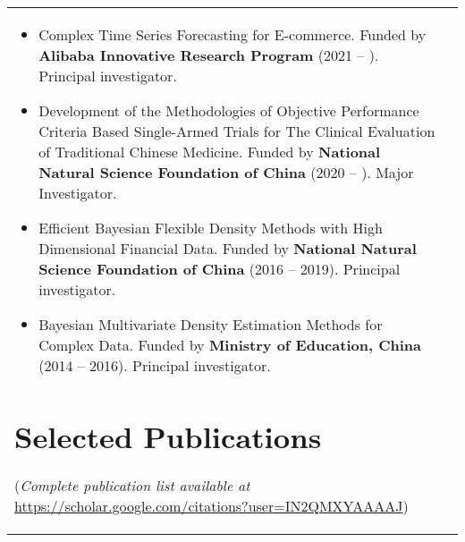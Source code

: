 \documentclass[twoside,a4paper,10.5pt]{article}
\begin{document}
\begin{tabular}{ll}
\begin{itemize}
\item Complex Time Series Forecasting for E-commerce. Funded by \textbf{Alibaba Innovative Research Program} (2021 -- ). Principal investigator.

\item Development of the Methodologies of Objective Performance Criteria Based Single-Armed Trials for The Clinical Evaluation of Traditional Chinese Medicine. Funded by \textbf{National Natural Science Foundation of China} (2020 --  ). Major Investigator.

\item Efficient Bayesian Flexible Density Methods with High Dimensional Financial Data. Funded by \textbf{National Natural Science Foundation of China} (2016 -- 2019). Principal investigator.

\item Bayesian Multivariate Density Estimation Methods for Complex Data. Funded by \textbf{Ministry of Education, China} (2014 -- 2016). Principal investigator.

\end{itemize}

\section*{Selected Publications}

(\emph{Complete publication list available at}
  \url{https://scholar.google.com/citations?user=IN2QMXYAAAAJ})

\begin{refsection}
\nocite{zhang2023optimal_ejor}
\nocite{li2023feature_ijpr}
\nocite{wang2023forecast_ijf}
\nocite{pan2022note_jbes}
\nocite{li2022bayesian_ijf}
\nocite{wang2022escalator_safety}
\nocite{wang2022distributed_ijf}
\nocite{anderer2022forecasting_ijf}
\nocite{janeway2021clinical_jad}
\nocite{petropoulos2021forecasting_ijf}
\nocite{kang2022forecast_ejor}
\nocite{pan2021note_jbes}
\nocite{talagala2022fformpp_ijf}
\nocite{zhu2021least_jcgs}
\nocite{wang2022uncertainty_jors}
\nocite{kang2021deja_jbr}
\nocite{hao2020bilinear_ced}
\nocite{li2020forecasting_eswa}
\nocite{kang2020gratis_sam}
\nocite{kang2020statscompcn}
\nocite{li2020fppcn}
\nocite{kalesan2020intersections_jsr}
\nocite{bailey2019changes_plosone}
\nocite{li2019credit_cef}
\nocite{li2018improving_ijf}
\nocite{pino2018cohort_bmj}
\nocite{li2016distributedcn}
\nocite{li2013bayesian}
\nocite{li2013efficient_sjs}
\nocite{li2011modeling_mixtures}
\nocite{li2010flexible_jspi}
\printbibliography[heading=none]
\end{refsection}


\end{tabular}
\end{document}

